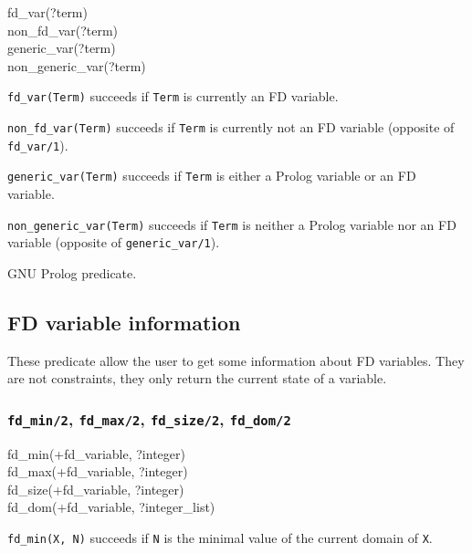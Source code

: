 \begin{TemplatesTwoCols}
fd\_var(?term)\\
non\_fd\_var(?term)\\
generic\_var(?term)\\
non\_generic\_var(?term)

\end{TemplatesTwoCols}

\Description

\texttt{fd\_var(Term)} succeeds if \texttt{Term} is currently an
FD variable.

\texttt{non\_fd\_var(Term)} succeeds if \texttt{Term} is
currently not an FD variable (opposite of \texttt{fd\_var/1}).

\texttt{generic\_var(Term)} succeeds if \texttt{Term} is
either a Prolog variable or an FD variable.

\texttt{non\_generic\_var(Term)} succeeds if
\texttt{Term} is neither a Prolog variable nor an FD variable
(opposite of \texttt{generic\_var/1}).

\PlErrorsNone

\Portability

GNU Prolog predicate.

\subsection{FD variable information}
These predicate allow the user to get some information about FD variables.
They are not constraints, they only return the current state of a variable.

\subsubsection{\texttt{fd\_min/2},
               \texttt{fd\_max/2},
               \texttt{fd\_size/2},
               \texttt{fd\_dom/2}}

\begin{TemplatesOneCol}
fd\_min(+fd\_variable, ?integer)\\
fd\_max(+fd\_variable, ?integer)\\
fd\_size(+fd\_variable, ?integer)\\
fd\_dom(+fd\_variable, ?integer\_list)

\end{TemplatesOneCol}

\Description

\texttt{fd\_min(X, N)} succeeds if \texttt{N} is the minimal value of the
current domain of \texttt{X}.

